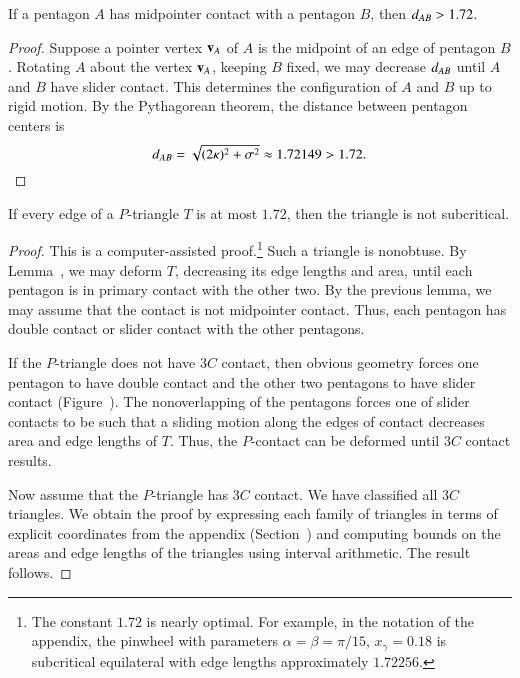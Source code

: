 \begin{lemma}  
  If a pentagon $A$ has midpointer contact with a pentagon $B$, then
  $d_{AB} > 1.72$.
\end{lemma}

\begin{proof} Suppose a pointer vertex ${\mathbf v}_A$ of $A$ is the midpoint of an
  edge of pentagon $B$.  Rotating $A$ about the vertex ${\mathbf v}_A$, keeping
  $B$ fixed, we may decrease $d_{AB}$ until $A$ and $B$
  have slider contact.  This determines the configuration of $A$ and
  $B$ up to rigid motion.  By the Pythagorean theorem, the
  distance between pentagon centers is
\[
d_{AB} = \sqrt{(2\kappa)^2 + \sigma^2} \approx 1.72149 > 1.72.
\] %
\end{proof}

\begin{lemma}
  If every edge of a $P$-triangle $T$ is at most $1.72$, then the
  triangle is not subcritical.
\end{lemma}

\begin{proof} This is a computer-assisted proof.\footnote{The constant
    $1.72$ is nearly optimal.  For example, in the notation of the
    appendix, the pinwheel with parameters $\alpha=\beta=\pi/15$,
    $x_\gamma = 0.18$ is subcritical equilateral with edge lengths
    approximately $1.72256$.} Such a triangle is nonobtuse.  By
  Lemma~, we may deform $T$, decreasing its
  edge lengths and area, until each pentagon is in primary contact
  with the other two.  By the previous lemma, we may assume that the
  contact is not midpointer contact.  Thus, each pentagon has double
  contact or slider contact with the other pentagons.

  If the $P$-triangle does not have $3C$ contact, then obvious
  geometry forces one pentagon to have double contact and the other
  two pentagons to have slider contact (Figure~).
  The nonoverlapping of the pentagons forces one of slider contacts to
  be such that a sliding motion along the edges of contact decreases
  area and edge lengths of $T$.  Thus, the $P$-contact can be deformed
  until $3C$ contact results.



Now assume that the $P$-triangle has $3C$ contact.  We have classified
all $3C$ triangles.  We obtain the proof by expressing each family of
triangles in terms of explicit coordinates from the appendix
(Section~) and computing bounds on the areas and
edge lengths of the triangles using interval arithmetic.  The result
follows.
\end{proof}

